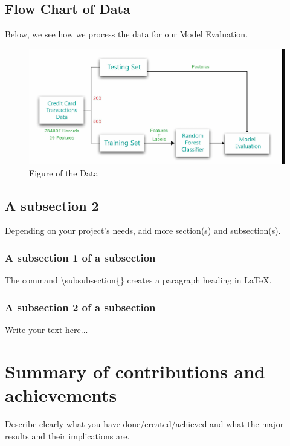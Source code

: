  

\subsection{Flow Chart of Data}
\label{sec:intro_some_sub1}


Below, we see how we process the data for our Model Evaluation.

\begin{figure}[ht]
    \centering
    \includegraphics[scale=0.6]{figures/FlowOfData.png}
    \caption{Figure of the Data}
    \label{fig:Plot of the Data}
\end{figure}

\subsection{A subsection 2}
\label{sec:intro_some_sub2}
Depending on your project's needs, add more section(s) and subsection(s).

\subsubsection{A subsection 1 of a subsection}
\label{sec:intro_some_subsub1}
The command \textbackslash subsubsection\{\} creates a paragraph heading in \LaTeX.

\subsubsection{A subsection 2 of a subsection}
\label{sec:intro_some_subsub2}
Write your text here...

\section{Summary of contributions and achievements} %
\label{sec:intro_sum_results} %
Describe clearly what you have done/created/achieved and what the major results and their implications are. 



